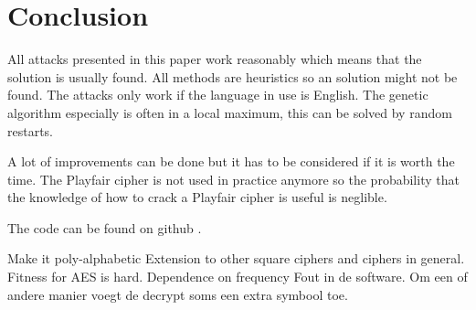 \documentclass[]{article}
\begin{document}
\section{Conclusion}
All attacks presented in this paper work reasonably which means that the solution is usually found. All methods are heuristics so an solution might not be found. The attacks only work if the language in use is English. The genetic algorithm especially is often in a local maximum, this can be solved by random restarts.

A lot of improvements can be done but it has to be considered if it is worth the time. The Playfair cipher is not used in practice anymore so the probability that the knowledge of how to crack a Playfair cipher is useful is neglible.

The code can be found on github \cite{}.

Make it poly-alphabetic
Extension to other square ciphers and ciphers in general.
Fitness for AES is hard.
Dependence on frequency
Fout in de software. Om een of andere manier voegt de decrypt soms een extra symbool toe.
\appendix
\end{document}
